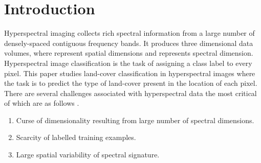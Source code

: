 \documentclass[journal]{IEEEtran}
\begin{document}
\IEEEpeerreviewmaketitle


\section{Introduction}
\label{sec:intro}
Hyperspectral imaging \cite{Landgrebe:2002,Richards:2013} collects rich spectral information from a large number of densely-spaced contiguous frequency bands. It produces three dimensional  data volumes, where  represent spatial dimensions and  represents spectral dimension. \\

Hyperspectral image classification \cite{Tuia:2013} is the task of assigning a class label to every pixel. This paper studies land-cover classification in hyperspectral images where the task is to predict the type of land-cover present in the location of each pixel. There are several challenges associated with hyperspectral data the most critical of which are as follows \cite{Valls:2005}.
\begin{enumerate}
\item Curse of dimensionality resulting from large number of spectral dimensions.
\item Scarcity of labelled training examples. 
\item Large spatial variability of spectral signature.
\end{enumerate}
\vspace{4.5mm}
\end{document}
